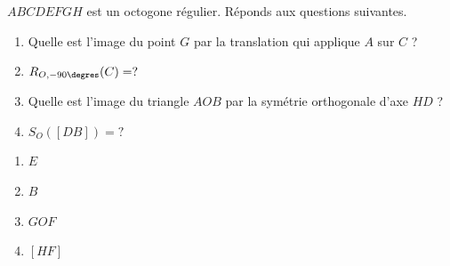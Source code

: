 \begin{exercise}[points=4]
    $ABCDEFGH$ est un octogone régulier. Réponds aux questions suivantes.
    \begin{center}
        
    \end{center}
    \begin{enumerate}
        \item Quelle est l'image du point $G$ par la translation qui applique $A$ sur $C$ ? 
        \item $R_{O,-90\degres}(C)=?$ 
        \item Quelle est l'image du triangle $AOB$ par la symétrie orthogonale d'axe $HD$ ? 
        \item $S_{O}([DB])=?$ \blank{$[HF]$}
    \end{enumerate}
\end{exercise}
\begin{solution}
    \begin{enumerate}[cols=4]
        \item $E$
        \item $B$
        \item $GOF$
        \item $[HF]$
    \end{enumerate}
\end{solution}
